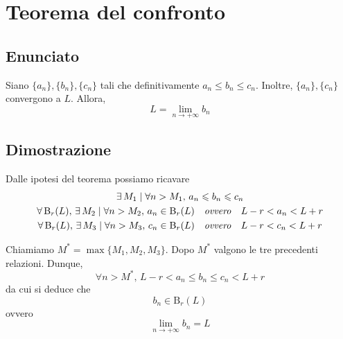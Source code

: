 \documentclass[../../analisi1]{subfiles}
\begin{document}
    \chapter{Teorema del confronto}

        \section*{Enunciato}

            Siano \(\{a_n\}, \{b_n\}, \{c_n\}\) tali che definitivamente \(a_n \leqslant b_n \leqslant c_n\).
            Inoltre, \(\{a_n\}, \{c_n\}\) convergono a \(L\). Allora,
            \[
                L = \lim_{n \to +\infty} b_n
            \]

        \section*{Dimostrazione}

            Dalle ipotesi del teorema possiamo ricavare
            \begin{gather*}
                \exists \, M_1 \; | \; \forall n > M_1, \, a_n \leqslant b_n \leqslant c_n\\
                \forall \, \mathrm{B}_r (L), \, \exists \, M_2 \; | \; \forall n > M_2, \, a_n \in \mathrm{B}_r (L) \quad \text{\emph{ovvero}} \quad L - r < a_n < L + r\\
                \forall \, \mathrm{B}_r (L), \, \exists \, M_3 \; | \; \forall n > M_3, \, c_n \in \mathrm{B}_r (L) \quad \text{\emph{ovvero}} \quad L - r < c_n < L + r
            \end{gather*}

            Chiamiamo \(M^* = \max\{M_1, M_2, M_3\}\). Dopo \(M^*\) valgono le tre precedenti relazioni. Dunque,
            \[
                \forall n > M^*, \, L - r < a_n \leqslant b_n \leqslant c_n < L + r
            \]
            da cui si deduce che
            \[
                b_n \in \mathrm{B}_r (L)
            \]
            ovvero
            \[
                \lim_{n \to +\infty} b_n = L
            \]
    
\end{document}
